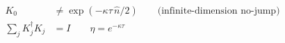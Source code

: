 \documentclass[12pt]{article}
\begin{document}
\fontsize{22}{28}\selectfont
\begin{align*}
K_0 &\neq \exp(-\kappa\tau\,\hat{n}/2)
      \qquad\text{(infinite-dimension no-jump)} \\[0.45em]
\sum_j K_j^\dagger K_j &= I
      \qquad
      \eta=e^{-\kappa\tau}
\end{align*}
\end{document}
